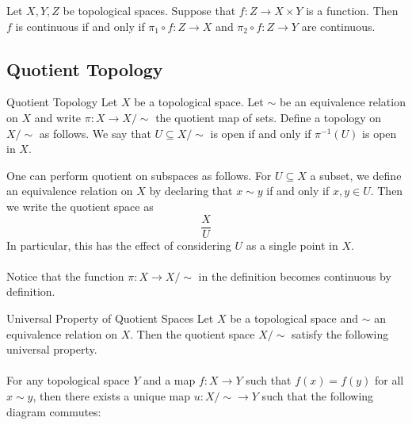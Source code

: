 \documentclass[a4paper]{article}
\begin{document}
\begin{prp}{}{} Let $X,Y,Z$ be topological spaces. Suppose that $f:Z\to X\times Y$ is a function. Then $f$ is continuous if and only if $\pi_1\circ f:Z\to X$ and $\pi_2\circ f:Z\to Y$ are continuous. 
\end{prp}

\subsection{Quotient Topology}
\begin{defn}{Quotient Topology}{} Let $X$ be a topological space. Let $\sim$ be an equivalence relation on $X$ and write $\pi:X\to X/\sim$ the quotient map of sets. Define a topology on $X/\sim$ as follows. We say that $U\subseteq X/\sim$ is open if and only if $\pi^{-1}(U)$ is open in $X$. 
\end{defn}

One can perform quotient on subspaces as follows. For $U\subseteq X$ a subset, we define an equivalence relation on $X$ by declaring that $x\sim y$ if and only if $x,y\in U$. Then we write the quotient space as $$\frac{X}{U}$$ In particular, this has the effect of considering $U$ as a single point in $X$. \\~\\

Notice that the function $\pi:X\to X/\sim$ in the definition becomes continuous by definition. 

\begin{thm}{Universal Property of Quotient Spaces}{} Let $X$ be a topological space and $\sim$ an equivalence relation on $X$. Then the quotient space $X/\sim$ satisfy the following universal property. \\~\\

For any topological space $Y$ and a map $f:X\to Y$ such that $f(x)=f(y)$ for all $x\sim y$, then there exists a unique map $u:X/\sim\to Y$ such that the following diagram commutes: \\~\\
 \\~\\
\end{thm}
\end{document}
